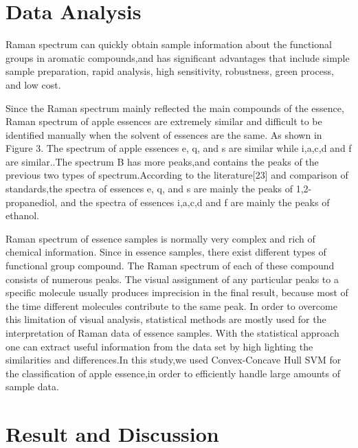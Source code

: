 \documentclass[a4paper]{article}
\begin{document}
\section{Data Analysis}



Raman spectrum can quickly obtain sample information about the functional groups in aromatic compounds,and has significant advantages that include simple sample preparation, rapid analysis, high sensitivity, robustness, green process, and low cost.

Since the Raman spectrum mainly reflected the main compounds of the essence, Raman spectrum of apple essences are extremely similar and difficult to be identified manually when the solvent of essences are the same. As shown in Figure 3. The spectrum of apple essences e, q, and s are similar while  i,a,c,d and f are similar..The spectrum B has more peaks,and contains the peaks of the previous two types of spectrum.According to the literature[23] and comparison of standards,the spectra of essences e, q, and s are mainly the peaks of 1,2-propanediol, and the spectra of essences  i,a,c,d and f are mainly the peaks of ethanol.

Raman  spectrum  of  essence samples  is  normally  very  complex  and  rich  of  chemical information.  Since  in essence  samples,  there  exist  different  types  of  functional group compound. The Raman spectrum of each of these compound consists of  numerous peaks.  The  visual  assignment  of  any  particular  peaks  to  a  specific  molecule usually  produces  imprecision  in  the  final  result,  because  most  of  the  time  different molecules  contribute  to  the  same  peak.  In  order  to  overcome  this  limitation  of  visual analysis, statistical methods are mostly used for the interpretation of Raman data of essence samples. With the statistical approach one can extract useful information from the data set by high  lighting  the  similarities  and differences.In  this  study,we  used Convex-Concave Hull SVM  for  the  classification of  apple essence,in order to efficiently handle large amounts of sample data.
\section{Result and Discussion}
\end{document}
